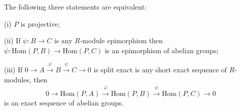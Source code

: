 \begin{theorem}
The following three statements are equivalent:\par
(i) $P$ is projective;\par
(ii) If $\psi:B\to C$ is any $R$-module epimorphism then $\overline{\psi}:\mathrm{Hom}(P,B)\to\mathrm{Hom}(P,C)$ is an epimorphism of abelian groups;\par
(iii) If $0\longrightarrow A\overset{\varphi}{\longrightarrow}B\overset{\psi}{\longrightarrow}C\longrightarrow 0$ is split exact is any short exact sequence of $R$-modules, then 
$$
0\longrightarrow \mathrm{Hom}\left( P,A \right) \overset{\overline{\varphi }}{\longrightarrow}\mathrm{Hom}\left( P,B \right) \overset{\overline{\psi }}{\longrightarrow}\mathrm{Hom}\left( P,C \right) \longrightarrow 0
$$
is an exact sequence of abelian groups.
\end{theorem}

